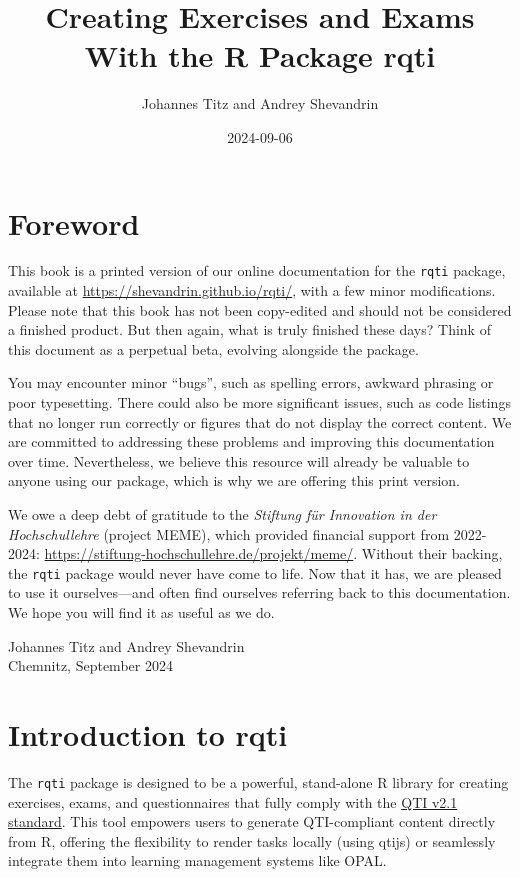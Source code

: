 \documentclass[twoside]{tufte-book}
\title{Creating Exercises and Exams With the R Package rqti}
\author{Johannes Titz and Andrey Shevandrin}
\date{2024-09-06}
\begin{document}
\maketitle



{
\setcounter{tocdepth}{1}
\tableofcontents
}

\chapter{Foreword}\label{foreword}

This book is a printed version of our online documentation for the \texttt{rqti} package, available at \url{https://shevandrin.github.io/rqti/}, with a few minor modifications. Please note that this book has not been copy-edited and should not be considered a finished product. But then again, what is truly finished these days? Think of this document as a perpetual beta, evolving alongside the package.

You may encounter minor ``bugs'', such as spelling errors, awkward phrasing or poor typesetting. There could also be more significant issues, such as code listings that no longer run correctly or figures that do not display the correct content. We are committed to addressing these problems and improving this documentation over time. Nevertheless, we believe this resource will already be valuable to anyone using our package, which is why we are offering this print version.

We owe a deep debt of gratitude to the \emph{Stiftung für Innovation in der Hochschullehre} (project MEME), which provided financial support from 2022-2024: \url{https://stiftung-hochschullehre.de/projekt/meme/}. Without their backing, the \texttt{rqti} package would never have come to life. Now that it has, we are pleased to use it ourselves---and often find ourselves referring back to this documentation. We hope you will find it as useful as we do.
\vspace{0.5cm}

\noindent Johannes Titz and Andrey Shevandrin\\
Chemnitz, September 2024


\chapter{Introduction to rqti}\label{introduction-to-rqti}

The \texttt{rqti} package is designed to be a powerful, stand-alone R library for creating exercises, exams, and questionnaires that fully comply with the \href{https://www.imsglobal.org/question/qtiv2p1/imsqti_implv2p1.html}{QTI v2.1 standard}. This tool empowers users to generate QTI-compliant content directly from R, offering the flexibility to render tasks locally (using qtijs) or seamlessly integrate them into learning management systems like OPAL.
\end{document}
